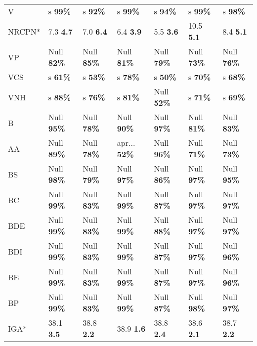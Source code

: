 \begin{tabular}{l|llllll}
        V &      s \textbf{99\%} &      s \textbf{92\%} &      s \textbf{99\%} &      s \textbf{94\%} &      s \textbf{99\%} &      s \textbf{98\%} \\
    NRCPN* &     7.3 \textbf{4.7} &     7.0 \textbf{6.4} &     6.4 \textbf{3.9} &     5.5 \textbf{3.6} &    10.5 \textbf{5.1} &     8.4 \textbf{5.1} \\
       VP &   Null \textbf{82\%} &   Null \textbf{85\%} &   Null \textbf{81\%} &   Null \textbf{79\%} &   Null \textbf{73\%} &   Null \textbf{76\%} \\
      VCS &      s \textbf{61\%} &      s \textbf{53\%} &      s \textbf{78\%} &      s \textbf{50\%} &      s \textbf{70\%} &      s \textbf{68\%} \\
      VNH &      s \textbf{88\%} &      s \textbf{76\%} &      s \textbf{81\%} &   Null \textbf{52\%} &      s \textbf{71\%} &      s \textbf{69\%} \\
        B &   Null \textbf{95\%} &   Null \textbf{78\%} &   Null \textbf{90\%} &   Null \textbf{97\%} &   Null \textbf{81\%} &   Null \textbf{83\%} \\
       AA &   Null \textbf{89\%} &   Null \textbf{78\%} & apr... \textbf{52\%} &   Null \textbf{96\%} &   Null \textbf{71\%} &   Null \textbf{73\%} \\
       BS &   Null \textbf{98\%} &   Null \textbf{79\%} &   Null \textbf{97\%} &   Null \textbf{86\%} &   Null \textbf{97\%} &   Null \textbf{95\%} \\
       BC &   Null \textbf{99\%} &   Null \textbf{83\%} &   Null \textbf{99\%} &   Null \textbf{87\%} &   Null \textbf{97\%} &   Null \textbf{97\%} \\
      BDE &   Null \textbf{99\%} &   Null \textbf{83\%} &   Null \textbf{99\%} &   Null \textbf{88\%} &   Null \textbf{97\%} &   Null \textbf{97\%} \\
      BDI &   Null \textbf{99\%} &   Null \textbf{83\%} &   Null \textbf{99\%} &   Null \textbf{87\%} &   Null \textbf{97\%} &   Null \textbf{96\%} \\
       BE &   Null \textbf{99\%} &   Null \textbf{83\%} &   Null \textbf{99\%} &   Null \textbf{87\%} &   Null \textbf{97\%} &   Null \textbf{96\%} \\
       BP &   Null \textbf{99\%} &   Null \textbf{83\%} &   Null \textbf{99\%} &   Null \textbf{87\%} &   Null \textbf{98\%} &   Null \textbf{97\%} \\
      IGA* &    38.1 \textbf{3.5} &    38.8 \textbf{2.2} &    38.9 \textbf{1.6} &    38.8 \textbf{2.4} &    38.6 \textbf{2.1} &    38.7 \textbf{2.2} \\

\end{tabular}

